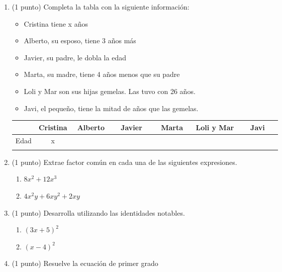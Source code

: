 \documentclass[a4paper,12pt]{extarticle}
\begin{document}
    \begin{enumerate}
        \item (1 punto) Completa la tabla con la siguiente información: 
        
        \begin{itemize}
            \item Cristina tiene x años
            \item Alberto, su esposo, tiene 3 años más 
            \item Javier, su padre, le dobla la edad
            \item Marta, su madre, tiene 4 años menos que su padre
            \item Loli y Mar son sus hijas gemelas. Las tuvo con 26 años.
            \item Javi, el pequeño, tiene la mitad de años que las gemelas.
        \end{itemize} 
        \begin{tabular}{| c | c | c | c | c | c | c | }
                \hline
                & Cristina & Alberto & Javier & Marta & Loli y Mar &  Javi \\ \hline
                Edad & x & $ \hspace{2cm}$  & $ \hspace{2cm}$ & $ \hspace{2cm}$  &$ \hspace{2cm}$ &  $ \hspace{2cm}$\\ 
                &  &  &  &   & &  \\ 
                \hline
            \end{tabular}
        \item (1 punto) Extrae factor común en cada una de las siguientes expresiones.
        \begin{enumerate}
            \item $8x^2+12x^3$
            \item $4x^2y+6xy^2+2xy$
        \end{enumerate}
        \item (1 punto) Desarrolla utilizando las identidades notables.
        \begin{enumerate}
            \item $(3x+5)^2$
            \item $(x-4)^2$
        \end{enumerate}
        \item (1 punto) Resuelve la ecuación de primer grado

\end{enumerate}
\end{document}
